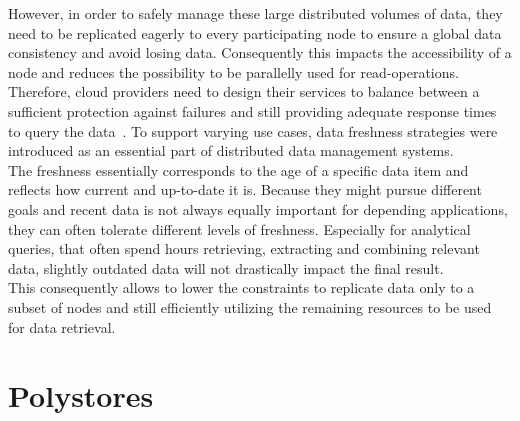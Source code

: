 However, in order to safely manage these large distributed volumes of data, they need to be replicated eagerly to 
every participating node to ensure a global data consistency and avoid losing data. 
Consequently this impacts the accessibility of a node and reduces the possibility to be parallelly used for read-operations.
Therefore, cloud providers need to design their services 
to balance between a sufficient protection against failures and still providing adequate response times to query the data~\cite{cap2002, levandowski2013}.
To support varying use cases, data freshness strategies were introduced as an essential part of distributed data management systems.\\
The freshness essentially corresponds to the age of a specific data item and reflects how current and up-to-date it is.
Because they might pursue different goals and recent data is not always equally important for depending applications, they can often tolerate different levels of freshness.
Especially for analytical queries, that often spend hours retrieving, extracting and combining relevant data, slightly outdated data will not drastically 
impact the final result.\\
This consequently allows to lower the constraints to replicate data only to a subset of nodes and still efficiently 
utilizing the remaining resources to be used for data retrieval.




\section{Polystores}

